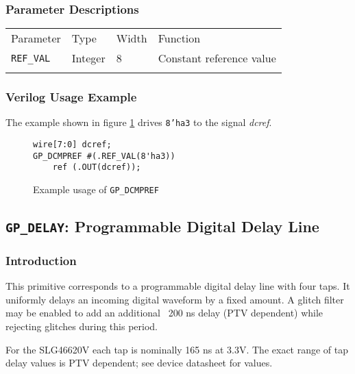 \documentclass[11pt]{article}
\newcommand{\namestyle}[1]{\textit{#1}}
\newcommand{\tokenstyle}[1]{\texttt{#1}}
\newcommand{\datastyle}[1]{\texttt{#1}}
\newcommand{\whenstyle}[1]{{\fontseries{sb}\selectfont#1}}
\newcommand{\thinhline}{\Xhline{1\arrayrulewidth}}
\newcommand{\thickhline}{\Xhline{2.5\arrayrulewidth}}
\begin{document}
\subsubsection{Parameter Descriptions}

\begin{tabularx}{\textwidth}{lllX}
\thinhline
\whenstyle{Parameter} & \whenstyle{Type} & \whenstyle{Width} & \whenstyle{Function} \\
\thickhline
\tokenstyle{REF\_VAL} & Integer & 8 & Constant reference value \\
\thinhline
\end{tabularx}

\subsubsection{Verilog Usage Example}

The example shown in figure \ref{gp-dcmpref-example} drives \datastyle{8'ha3} to the signal \namestyle{dcref}.

\begin{figure}[h]
\begin{lstlisting}
wire[7:0] dcref;
GP_DCMPREF #(.REF_VAL(8'ha3))
	ref (.OUT(dcref));
\end{lstlisting}
\caption{Example usage of \tokenstyle{GP\_DCMPREF}}
\label{gp-dcmpref-example}
\end{figure}


\pagebreak
\subsection{\tokenstyle{GP\_DELAY}: Programmable Digital Delay Line}
\label{gp-delay}

\subsubsection{Introduction}
This primitive corresponds to a programmable digital delay line with four taps. It uniformly delays an incoming digital
waveform by a fixed amount. A glitch filter may be enabled to add an additional ~200 ns delay (PTV dependent) while
rejecting glitches during this period.

For the SLG46620V each tap is nominally 165 ns at 3.3V. The exact range of tap delay values is PTV dependent; see
device datasheet for values.
\end{document}
